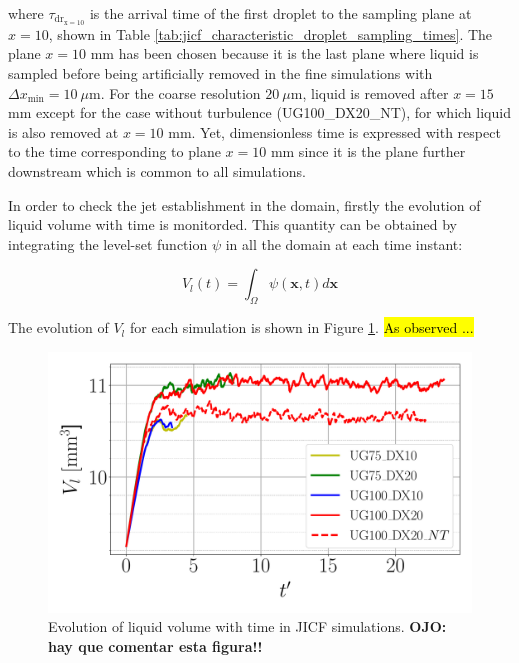 where $\tau_\mathrm{dr_{x=10}}$ is the arrival time of the first droplet to the sampling plane at $x = 10$, shown in Table \ref{tab:jicf_characteristic_droplet_sampling_times}. The plane $x = 10$ mm has been chosen because it is the last plane where liquid is sampled before being artificially removed in the fine simulations with $\Delta x_\mathrm{min} = 10 ~\mu$m. For the coarse resolution $20 ~\mu$m, liquid is removed after $x = 15$ mm except for the case without turbulence (UG100\_DX20\_NT), for which liquid is also removed at $x = 10$ mm. Yet, dimensionless time is expressed with respect to the time corresponding to plane $x = 10$ mm since it is the plane further downstream which is common to all simulations. 

In order to check the jet establishment in the domain, firstly the evolution of liquid volume with time is monitorded. This quantity can be obtained by integrating the level-set function $\psi$ in all the domain at each time instant:

\begin{equation}
\label{eq:liquid_volume_from_levelset_definition}
V_l \left ( t \right) = \int_{\Omega} \psi \left( \textbf{x}, t \right) d\textbf{x}
\end{equation}

The evolution of $V_l$ for each simulation is shown in Figure \ref{fig:JICF_liquid_volume_increase}. \hl{As observed ...}

\begin{figure}[ht]
\centering
	\centering
   \includegraphics[scale=0.24]{./part2_developments/figures_ch5_resolved_JICF/JICF_liquid_volume_increase}
   \caption{Evolution of liquid volume with time in JICF simulations. \textbf{OJO: hay que comentar esta figura!!}}
\label{fig:JICF_liquid_volume_increase}
\end{figure}

